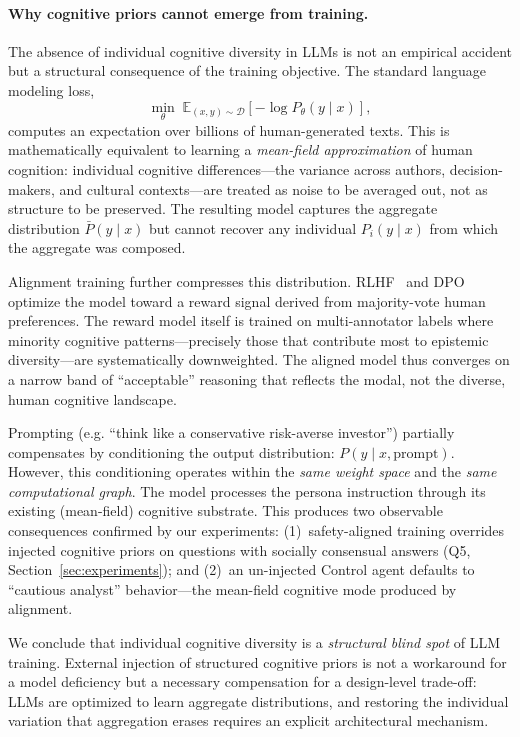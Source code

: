 \documentclass[11pt]{article}
\newcommand{\eg}{e.g.}
\begin{document}
\paragraph{Why cognitive priors cannot emerge from training.}
The absence of individual cognitive diversity in LLMs is not an empirical accident but a structural consequence of the training objective. The standard language modeling loss,
\begin{equation}
    \min_\theta \; \mathbb{E}_{(x,y) \sim \mathcal{D}} \left[ -\log P_\theta(y \mid x) \right],
\end{equation}
computes an expectation over billions of human-generated texts. This is mathematically equivalent to learning a \emph{mean-field approximation} of human cognition: individual cognitive differences---the variance across authors, decision-makers, and cultural contexts---are treated as noise to be averaged out, not as structure to be preserved. The resulting model captures the aggregate distribution $\bar{P}(y \mid x)$ but cannot recover any individual $P_i(y \mid x)$ from which the aggregate was composed.

Alignment training further compresses this distribution. RLHF~\citep{christiano2017deep} and DPO~\citep{rafailov2023direct} optimize the model toward a reward signal derived from majority-vote human preferences. The reward model itself is trained on multi-annotator labels where minority cognitive patterns---precisely those that contribute most to epistemic diversity---are systematically downweighted. The aligned model thus converges on a narrow band of ``acceptable'' reasoning that reflects the modal, not the diverse, human cognitive landscape.

Prompting (\eg{} ``think like a conservative risk-averse investor'') partially compensates by conditioning the output distribution: $P(y \mid x, \text{prompt})$. However, this conditioning operates within the \emph{same weight space} and the \emph{same computational graph}. The model processes the persona instruction through its existing (mean-field) cognitive substrate. This produces two observable consequences confirmed by our experiments: (1)~safety-aligned training overrides injected cognitive priors on questions with socially consensual answers (Q5, Section~\ref{sec:experiments}); and (2)~an un-injected Control agent defaults to ``cautious analyst'' behavior---the mean-field cognitive mode produced by alignment.

We conclude that individual cognitive diversity is a \emph{structural blind spot} of LLM training. External injection of structured cognitive priors is not a workaround for a model deficiency but a necessary compensation for a design-level trade-off: LLMs are optimized to learn aggregate distributions, and restoring the individual variation that aggregation erases requires an explicit architectural mechanism.
\end{document}
